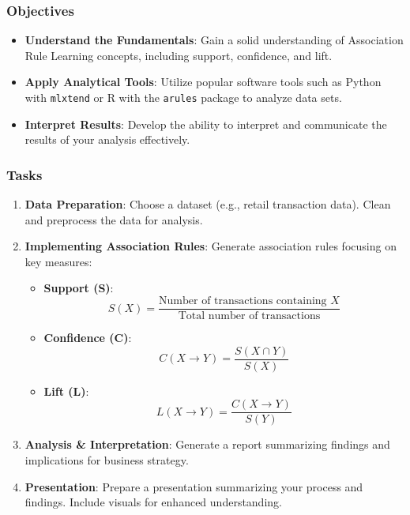 \documentclass[aspectratio=169]{beamer}
\begin{document}
\begin{frame}[fragile]
    \frametitle{Objectives}
    \begin{itemize}
        \item \textbf{Understand the Fundamentals}: Gain a solid understanding of Association Rule Learning concepts, including support, confidence, and lift.
        \item \textbf{Apply Analytical Tools}: Utilize popular software tools such as Python with \texttt{mlxtend} or R with the \texttt{arules} package to analyze data sets.
        \item \textbf{Interpret Results}: Develop the ability to interpret and communicate the results of your analysis effectively.
    \end{itemize}
\end{frame}

\begin{frame}[fragile]
    \frametitle{Tasks}
    \begin{enumerate}
        \item \textbf{Data Preparation}: Choose a dataset (e.g., retail transaction data). Clean and preprocess the data for analysis.
        \item \textbf{Implementing Association Rules}: Generate association rules focusing on key measures:
            \begin{itemize}
                \item \textbf{Support (S)}:
                    \begin{equation}
                    S(X) = \frac{\text{Number of transactions containing } X}{\text{Total number of transactions}}
                    \end{equation}
                \item \textbf{Confidence (C)}:
                    \begin{equation}
                    C(X \rightarrow Y) = \frac{S(X \cap Y)}{S(X)}
                    \end{equation}
                \item \textbf{Lift (L)}:
                    \begin{equation}
                    L(X \rightarrow Y) = \frac{C(X \rightarrow Y)}{S(Y)}
                    \end{equation}
            \end{itemize}
        \item \textbf{Analysis \& Interpretation}: Generate a report summarizing findings and implications for business strategy.
        \item \textbf{Presentation}: Prepare a presentation summarizing your process and findings. Include visuals for enhanced understanding.
    \end{enumerate}
\end{frame}
\end{document}
